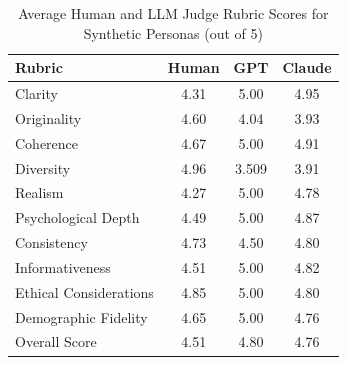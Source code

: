 \documentclass[11pt]{article}
\begin{document}
\begin{table}[!htb]
\centering
\caption{Average Human and LLM Judge Rubric Scores for Synthetic Personas (out of 5)}
\label{tab:mean persona rater score}
\footnotesize
\renewcommand\arraystretch{1.2}
\begin{tabularx}{\columnwidth}{@{}Xccc@{}}
\toprule
\textbf{Rubric} & \textbf{Human} & \textbf{GPT} & \textbf{Claude} \\
\midrule
Clarity                                         & 4.31 & 5.00 & 4.95 \\
Originality                                     & 4.60 & 4.04 & 3.93 \\
Coherence                                       & 4.67 & 5.00 & 4.91 \\
Diversity                                       & 4.96 & 3.509 & 3.91\\
Realism                                         & 4.27 & 5.00 & 4.78\\
Psychological Depth                             & 4.49 & 5.00 & 4.87\\
Consistency                                     & 4.73 & 4.50 & 4.80\\
Informativeness                                 & 4.51 & 5.00 & 4.82\\
Ethical Considerations                          & 4.85 & 5.00 & 4.80\\
Demographic Fidelity                            & 4.65 & 5.00 & 4.76\\
Overall Score                                   & 4.51 & 4.80 & 4.76\\
\bottomrule
\end{tabularx}
\end{table}
\end{document}
